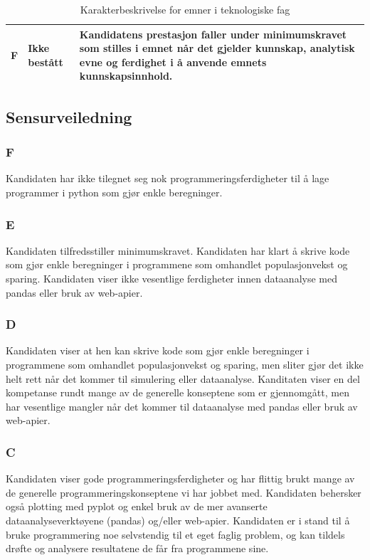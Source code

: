 \documentclass[12pt, titlepage]{article}
\begin{document}
\begin{table}[h!]
\begin{center}
\begin{tabular}{|l|l|p{12cm}|}
      \hline
      F & Ikke bestått & Kandidatens prestasjon faller under minimumskravet som stilles i emnet når det gjelder kunnskap, analytisk evne og ferdighet i å anvende emnets kunnskapsinnhold. \\
      \hline
   \end{tabular}
   \end{center}
   \caption{Karakterbeskrivelse for emner i teknologiske fag}\label{tab:karakterbeskrivelse}
\end{table}

\newpage
\subsection*{Sensurveiledning}
\subsubsection*{F}
Kandidaten har ikke tilegnet seg nok programmeringsferdigheter til å lage programmer i python som gjør enkle beregninger.

\subsubsection*{E}
Kandidaten tilfredsstiller minimumskravet. Kandidaten har klart å skrive kode som gjør enkle beregninger i programmene som omhandlet populasjonvekst og sparing.
Kandidaten viser ikke vesentlige ferdigheter innen dataanalyse med pandas eller bruk av web-apier.

\subsubsection*{D}
Kandidaten viser at hen kan skrive kode som gjør enkle beregninger i programmene som omhandlet populasjonvekst og sparing, men sliter gjør det ikke helt rett når det kommer til simulering eller dataanalyse. 
Kanditaten viser en del kompetanse rundt mange av de generelle konseptene som er gjennomgått, men har vesentlige mangler når det kommer
til dataanalyse med pandas eller bruk av web-apier.

\subsubsection*{C}
Kandidaten viser gode programmeringsferdigheter og har flittig brukt mange av de generelle programmeringskonseptene vi har jobbet med. 
Kandidaten behersker også plotting med pyplot og enkel bruk av de mer avanserte dataanalyseverktøyene (pandas) og/eller web-apier. Kandidaten er i stand
til å bruke programmering noe selvstendig til et eget faglig problem, og kan tildels drøfte og analysere resultatene de får fra programmene sine.
\end{document}
